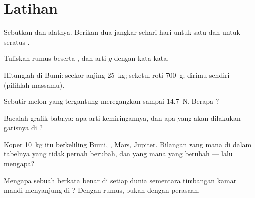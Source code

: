 \section{Latihan}

\begin{exercise}[$\star$]\label{exo:g9:weight-vs-mass:1}
Sebutkan   dan alatnya. Berikan dua jangkar sehari-hari
untuk satu  dan untuk seratus .
\end{exercise}

\begin{exercise}[$\star$]\label{exo:g9:weight-vs-mass:2}
Tuliskan rumus  beserta , dan arti $g$ dengan
kata-kata.
\end{exercise}

\begin{exercise}[$\star$]\label{exo:g9:weight-vs-mass:3}
Hitunglah  di Bumi: seekor anjing \qty{25}{kg}; seketul roti
\qty{700}{g}; dirimu sendiri (pilihlah massamu).
\end{exercise}

\begin{exercise}[$\star$]\label{exo:g9:weight-vs-mass:4}
Sebutir melon yang tergantung meregangkan  sampai
\qty{14.7}{N}. Berapa ?
\end{exercise}

\begin{exercise}[$\star$]\label{exo:g9:weight-vs-mass:5}
Bacalah grafik babnya: apa arti kemiringannya, dan apa yang akan
dilakukan garisnya di ?
\end{exercise}

\begin{exercise}[$\star$]\label{exo:g9:weight-vs-mass:6}
Koper \qty{10}{kg} itu berkeliling Bumi, , Mars, Jupiter.
Bilangan yang mana di dalam tabelnya yang tidak pernah berubah, dan
yang mana yang berubah --- lalu mengapa?
\end{exercise}

\begin{exercise}[$\star$]\label{exo:g9:weight-vs-mass:7}
Mengapa sebuah  berkata benar di setiap dunia sementara
timbangan kamar mandi menyanjung di ? Dengan rumus, bukan dengan
perasaan.
\end{exercise}

